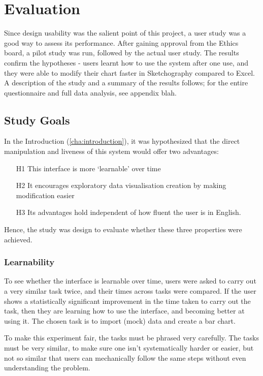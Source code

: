 \chapter{Evaluation}
Since design usability was the salient point of this project, a user study was a good way to assess its performance. After gaining approval from the Ethics board, a pilot study was run, followed by the actual user study. The results confirm the hypotheses - users learnt how to use the system after one use, and they were able to modify their chart faster in Sketchography compared to Excel. A description of the study and a summary of the results follows; for the entire questionnaire and full data analysis, see appendix blah.

\section{Study Goals}
In the Introduction (\autoref{cha:introduction}), it was hypothesized that the direct manipulation and liveness of this system would offer two advantages:

\begin{enumerate}
\item[H1] This interface is more `learnable' over time
\item[H2] It encourages exploratory data visualisation creation by making modification easier
\item[H3] Its advantages hold independent of how fluent the user is in English.
\end{enumerate}

Hence, the study was design to evaluate whether these three properties were achieved. 

\subsection*{Learnability}
To see whether the interface is learnable over time, users were asked to carry out a very similar task twice, and their times across tasks were compared. If the user shows a statistically significant improvement in the time taken to carry out the task, then they are learning how to use the interface, and becoming better at using it. The chosen task is to import (mock) data and create a bar chart.

To make this experiment fair, the tasks must be phrased very carefully. The tasks must be very similar, to make sure one isn't systematically harder or easier, but not so similar that users can mechanically follow the same steps without even understanding the problem.


